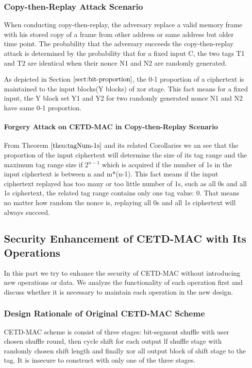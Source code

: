 \subsubsection{Copy-then-Replay Attack Scenario}
When conducting copy-then-replay, the adversary replace a valid memory frame with his stored copy of a frame from other address or same address but older time point. The probability that the adversary succeeds the copy-then-replay attack is determined by the probability that for a fixed input C, the two tags T1 and T2 are identical when their nonce N1 and N2 are randomly generated.

As depicted in Section $\ref{sect:bit-proportion}$, the 0-1 proportion of a ciphertext is maintained to the input blocks(Y blocks) of xor stage. This fact means for a fixed input, the Y block set Y1 and Y2 for two randomly generated nonce N1 and N2 have same 0-1 proportion.  
\paragraph{Forgery Attack on CETD-MAC in Copy-then-Replay Scenario}
From Theorem $\ref{theo:tagNum-1s}$ and its related Corollaries we an see that the proportion of the input ciphertext will determine the size of its tag range and the maximum tag range size if 2$^{n-1}$ which is acquired if the number of 1s in the input ciphertext is between n and m*(n-1).
This fact means if the input ciphertext replayed has too many or too little number of 1s, such as all 0s and all 1s ciphertext, the related tag range contains only one tag value: 0. That means no matter how random the nonce is, replaying all 0s and all 1s ciphertext will always succeed.

\subsection{Security Enhancement of CETD-MAC with Its Operations}\label{sect:pattern}
In this part we try to enhance the security of CETD-MAC without introducing new operations or data. We analyze the functionality of each operation first and discuss whether it is necessary to maintain each operation in the new design.
\subsubsection{Design Rationale of Original CETD-MAC Scheme}
CETD-MAC scheme is consist of three stages: bit-segment shuffle with user chosen shuffle round, then cycle shift for each output lf shuffle stage with randomly chosen shift length and finally xor all output block of shift stage to the tag. It is insecure to construct with only one of the three stages.
